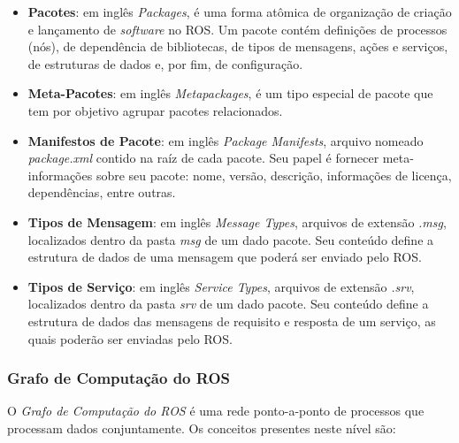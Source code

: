                 \begin{itemize}
                    \item \textbf{Pacotes}: em inglês \textit{Packages}, é uma forma atômica de organização de criação e lançamento de \textit{software} no ROS. Um pacote contém definições de processos (nós), de dependência de bibliotecas, de tipos de mensagens, ações e serviços, de estruturas de dados e, por fim, de configuração. 
                    
                    \item \textbf{Meta-Pacotes}: em inglês \textit{Metapackages}, é um tipo especial de pacote que tem por objetivo agrupar pacotes relacionados.
                    
                    \item \textbf{Manifestos de Pacote}: em inglês \textit{Package Manifests}, arquivo nomeado \textit{package.xml} contido na raíz de cada pacote. Seu papel é fornecer meta-informações sobre seu pacote: nome, versão, descrição, informações de licença, dependências, entre outras. 
                    
                    \item \textbf{Tipos de Mensagem}: em inglês \textit{Message Types}, arquivos de extensão \textit{.msg}, localizados dentro da pasta \textit{msg} de um dado pacote. Seu conteúdo define a estrutura de dados de uma mensagem que poderá ser enviado pelo ROS.
                    
                    \item \textbf{Tipos de Serviço}: em inglês \textit{Service Types}, arquivos de extensão \textit{.srv}, localizados dentro da pasta \textit{srv} de um dado pacote. Seu conteúdo define a estrutura de dados das mensagens de requisito e resposta de um serviço, as quais poderão ser enviadas pelo ROS.
                \end{itemize}
            
            \subsubsection{Grafo de Computação do ROS} \label{subsubsec:ros_grafo}
                O \textit{Grafo de Computação do ROS} é uma rede ponto-a-ponto de processos que processam dados conjuntamente. Os conceitos presentes neste nível são:
                
